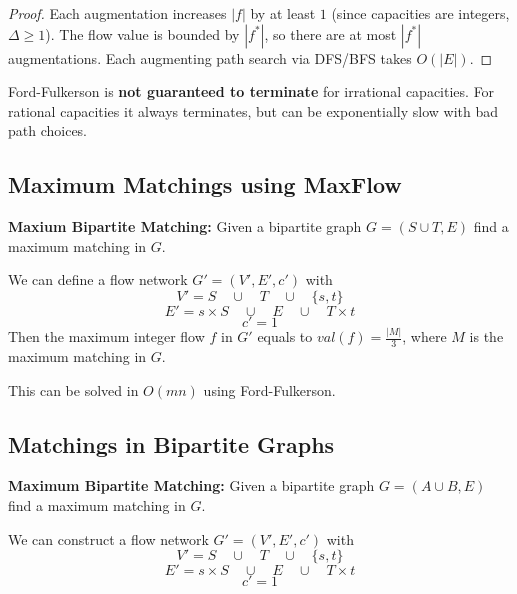 \begin{proof}
	Each augmentation increases $|f|$ by at least $1$ (since capacities are integers, $\Delta \geq 1$). The flow value is bounded by $|f^*|$, so there are at most $|f^*|$ augmentations. Each augmenting path search via DFS/BFS takes $O(|E|)$.
\end{proof}

\begin{important}
	Ford-Fulkerson is \textbf{not guaranteed to terminate} for irrational capacities. For rational capacities it always terminates, but can be exponentially slow with bad path choices.
\end{important}

\subsection{Maximum Matchings using MaxFlow}

\begin{definition}
	\textbf{Maxium Bipartite Matching: } Given a bipartite graph $ G = (S \cup T,E)$ find a maximum matching in $G$.
\end{definition}

\begin{remark}
	We can define a flow network $G' = (V', E', c')$ with
	$$V' = S \quad \cup \quad T \quad \cup \quad \{s, t\}$$
	$$E' = {s} \times S \quad \cup \quad E \quad \cup \quad T \times {t}$$
	$$c' = 1$$
	Then the maximum integer flow $f$ in $G'$ equals to $val(f) = \frac{|M|}{3}$, where $M$ is the maximum matching in $G$.
\end{remark}

\begin{remark}
	This can be solved in $O(mn)$ using Ford-Fulkerson.
\end{remark}

\subsection{Matchings in Bipartite Graphs}

\begin{definition}
	\textbf{Maximum Bipartite Matching: } Given a bipartite graph $G = (A \cup B, E)$ find a maximum matching in $G$.
\end{definition}

\begin{remark}
	We can construct a flow network $G' = (V', E', c')$ with
	$$V' = S \quad \cup \quad T \quad \cup \quad \{s, t\}$$
	$$E' = {s} \times S \quad \cup \quad E \quad \cup \quad T \times {t}$$
	$$c' = 1$$
\end{remark}

